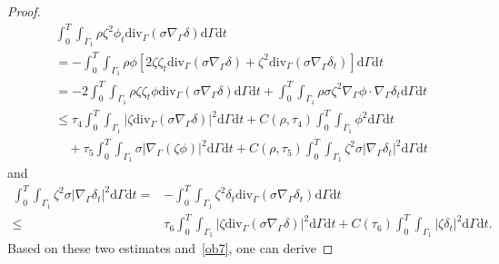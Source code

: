 \documentclass[10pt]{elsarticle}
\begin{document}
\begin{proof}
\begin{equation*}
\begin{split}
&\int_{0}^{T}\int_{\Gamma_1} {\rho \zeta^2 {\phi}_t \mathrm{div}_{\Gamma}\left(\sigma\nabla_{\Gamma} {\delta}\right)} \mathrm{d}\Gamma \mathrm{d}t \\
&=-\int_{0}^{T}\int_{\Gamma_1} \rho {\phi}\left[ 2\zeta\zeta_t\mathrm{div}_{\Gamma}\left(\sigma\nabla_{\Gamma} {\delta}\right) + \zeta^2\mathrm{div}_{\Gamma}\left(\sigma\nabla_{\Gamma} {\delta}_t\right)\right] \mathrm{d}\Gamma \mathrm{d}t\\
&=-2\int_{0}^{T}\int_{\Gamma_1} \rho \zeta\zeta_t {\phi}\mathrm{div}_{\Gamma}\left(\sigma\nabla_{\Gamma} {\delta}\right)\mathrm{d}\Gamma \mathrm{d}t + \int_{0}^{T}\int_{\Gamma_1}\rho\sigma\zeta^2\nabla_{\Gamma}\phi\cdot \nabla_{\Gamma} {\delta}_t\mathrm{d}\Gamma \mathrm{d}t\\
&\leqslant \tau_4\int_{0}^{T}\int_{\Gamma_1} |\zeta\mathrm{div}_{\Gamma}\left(\sigma\nabla_{\Gamma} {\delta}\right)|^2\mathrm{d}\Gamma \mathrm{d}t  +C(\rho, \tau_4)\int_{0}^{T}\int_{\Gamma_1} {\phi}^2\mathrm{d}\Gamma \mathrm{d}t\\
&\quad +\tau_5{\int_{0}^{T}\int_{\Gamma_1}\sigma |\nabla_{\Gamma}(\zeta\phi)|^2\mathrm{d}\Gamma \mathrm{d}t} + C(\rho, \tau_5)\int_{0}^{T}\int_{\Gamma_1}\zeta^2\sigma|\nabla_{\Gamma} {\delta}_t|^2\mathrm{d}\Gamma \mathrm{d}t
\end{split}
\end{equation*}
and
\begin{equation*}
\begin{split}
\int_{0}^{T}\int_{\Gamma_1}\zeta^2\sigma|\nabla_{\Gamma} {\delta}_t|^2\mathrm{d}\Gamma \mathrm{d}t =&- \int_{0}^{T}\int_{\Gamma_1}\zeta^2{\delta}_t \mathrm{div}_{\Gamma}\left(\sigma\nabla_{\Gamma} {\delta}_t \right)\mathrm{d}\Gamma \mathrm{d}t\\
\leqslant &\tau_6\int_{0}^{T}\int_{\Gamma_1} |\zeta\mathrm{div}_{\Gamma}\left(\sigma\nabla_{\Gamma} {\delta}\right)|^2\mathrm{d}\Gamma \mathrm{d}t + C(\tau_6)\int_{0}^{T}\int_{\Gamma_1}|\zeta\delta_t|^2\mathrm{d}\Gamma \mathrm{d}t. 
\end{split}
\end{equation*}
Based on these two estimates and~\eqref{ob7}, one can derive

\end{proof}
\end{document}

